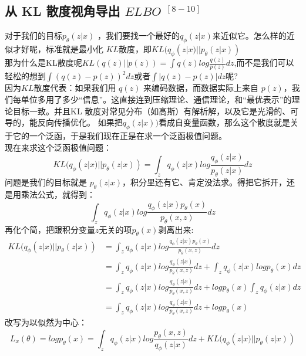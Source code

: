 \documentclass[final]{ws-ijseke}
\begin{document}
 \subsection{从 KL 散度视角导出 $ELBO$ $^{[8-10]}$}
 \hspace*{2em} 对于我们的目标$p_\theta(z|x)$ ，我们要找一个最好的$q_\phi(z|x)$来近似它。怎么样的近似才好呢，标准就是最小化
 $KL$散度，即$KL(q_\phi(z|x)||p_\theta(z|x))$\\
 \hspace*{2em} 那为什么是KL散度呢$KL(q(z)||p(z)) = \int q(z)log\frac{q(z)}{p(z)}dz$,而不是我们可以轻松的想到$\int (q(z)−p(z))^2dz$或者$\int |q(z)−p(z)|dz$呢?\\ \hspace*{2em} 因为$KL$散度代表：如果我们用 $q(z)$ 来编码数据，而数据实际上来自 $p(z)$，我们每单位多用了多少“信息”。这直接连到压缩理论、通信理论，和“最优表示”的理论目标一致。并且KL 散度对常见分布（如高斯）有解析解，以及它是光滑的、可导的，能反向传播优化。
 如果把$q_\phi(z|x))$看成自变量函数，那么这个散度就是关于它的一个泛函，于是我们现在正是在求一个泛函极值问题。\\
 现在来求这个泛函极值问题：\\
\begin{equation*}
KL(q_\phi(z|x)||p_\theta(z|x)) = \int_z q_\phi(z|x)log\frac{q_\phi(z|x)}{p_\theta(z|x)}dz
\end{equation*}
\hspace*{2em} 问题是我们的目标就是 $p_\theta(z|x)$，积分里还有它、肯定没法求。得把它拆开，还是用乘法公式，就得到：
 \begin{equation*}
\int_z q_\phi(z|x)log\frac{q_\phi(z|x)p_\theta(x)}{p_\theta(x,z)}dz
\end{equation*}
再化个简，把跟积分变量$z$无关的项$p_\theta(x)$剥离出来:
 \begin{align*}
KL(q_\phi(z|x)||p_\theta(z|x)) &=\int_z q_\phi(z|x)log\frac{q_\phi(z|x)p_\theta(x)}{p_\theta(x,z)}dz\\ & = \int_z q_\phi(z|x)log\frac{q_\phi(z|x)}{p_\theta(x,z)}dz + \int_z q_\phi(z|x)logp_\theta(x)dz \\ &= \int_z q_\phi(z|x)log\frac{q_\phi(z|x)}{p_\theta(x,z)}dz + logp_\theta(x)\int_z q_\phi(z|x)dz\\ &= \int_z q_\phi(z|x)log\frac{q_\phi(z|x)}{p_\theta(x,z)}dz + logp_\theta(x)
 \end{align*}
 改写为以似然为中心：
 \begin{equation*}
L_x(\theta) = logp_\theta(x) = \int_z q_\phi(z|x)log\frac{p_\theta(x,z)}{q_\phi(z|x)}dz + KL(q_\phi(z|x)||p_\theta(z|x))
\end{equation*}
\end{document}
